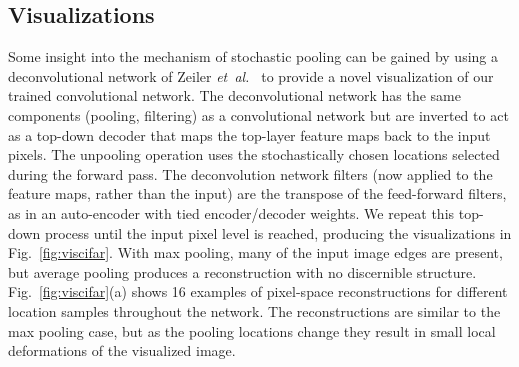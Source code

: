 \documentclass{article} %
\newcommand{\fig}[1]{Fig.~\ref{fig:#1}}
\def\etal{{\textit{et~al.~}}}
\begin{document}
\subsection{Visualizations}
\vspace{-2mm}
Some insight into the mechanism of stochastic pooling can be gained by using a deconvolutional
network of Zeiler \etal \cite{Zeiler11} to provide a novel visualization of our trained
convolutional network. The deconvolutional network has the same components (pooling, filtering) as a
convolutional network but are inverted to act as a top-down decoder that maps the top-layer feature
maps back to
the input pixels. The unpooling operation uses the stochastically chosen locations selected during
the forward pass. The deconvolution network filters (now applied to the feature maps, rather than
the input) are the transpose of the feed-forward filters, as in an auto-encoder with tied
encoder/decoder weights. We repeat this top-down process until the input pixel level is reached, producing
the visualizations in \fig{viscifar}. With max pooling, many of the input image edges are present,
but average pooling produces a reconstruction with no discernible structure.  \fig{viscifar}(a)
shows 16 examples of pixel-space reconstructions for different location samples throughout the
network. The reconstructions are similar to the max pooling case, but as the pooling locations
change they result in small local deformations of the visualized image.











\end{document}
